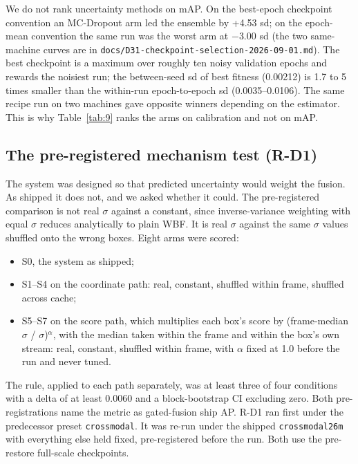 \documentclass[journal,onecolumn]{IEEEtran}
\begin{document}
We do not rank uncertainty methods on mAP. On the best-epoch checkpoint convention an MC-Dropout arm led the ensemble by +4.53 sd; on the epoch-mean convention the same run was the worst arm at $-$3.00 sd (the two same-machine curves are in \texttt{docs/\allowbreak{}D31-\allowbreak{}checkpoint-\allowbreak{}selection-\allowbreak{}2026-\allowbreak{}09-\allowbreak{}01.md}). The best checkpoint is a maximum over roughly ten noisy validation epochs and rewards the noisiest run; the between-seed sd of best fitness (0.00212) is 1.7 to 5 times smaller than the within-run epoch-to-epoch sd (0.0035--0.0106). The same recipe run on two machines gave opposite winners depending on the estimator. This is why Table~\ref{tab:9} ranks the arms on calibration and not on mAP.

\subsection{The pre-registered mechanism test (R-D1)}\label{app:E.2}
The system was designed so that predicted uncertainty would weight the fusion. As shipped it does not, and we asked whether it could. The pre-registered comparison is not real $\sigma$ against a constant, since inverse-variance weighting with equal $\sigma$ reduces analytically to plain WBF. It is real $\sigma$ against the same $\sigma$ values shuffled onto the wrong boxes. Eight arms were scored:
\begin{itemize}
\item S0, the system as shipped;
\item S1--S4 on the coordinate path: real, constant, shuffled within frame, shuffled across cache;
\item S5--S7 on the score path, which multiplies each box's score by (frame-median $\sigma$ / $\sigma$)$^{\alpha}$, with the median taken within the frame and within the box's own stream: real, constant, shuffled within frame, with $\alpha$ fixed at 1.0 before the run and never tuned.
\end{itemize}

The rule, applied to each path separately, was at least three of four conditions with a delta of at least 0.0060 and a block-bootstrap CI excluding zero. Both pre-registrations name the metric as gated-fusion ship AP. R-D1 ran first under the predecessor preset \texttt{crossmodal}. It was re-run under the shipped \texttt{crossmodal26m} with everything else held fixed, pre-registered before the run. Both use the pre-restore full-scale checkpoints.
\end{document}
